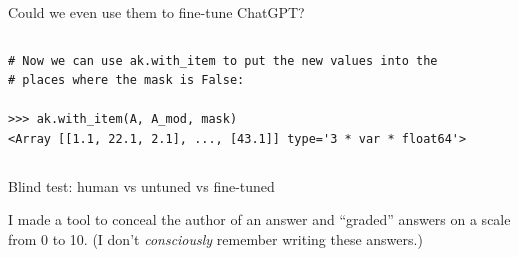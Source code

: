 \documentclass[aspectratio=169]{beamer}
\begin{document}
\begin{frame}[fragile]{Could we even use them to fine-tune ChatGPT?}
\begin{columns}
\begin{uncoverenv}
\begin{verbatim}
# Now we can use ak.with_item to put the new values into the
# places where the mask is False:

>>> ak.with_item(A, A_mod, mask)
<Array [[1.1, 22.1, 2.1], ..., [43.1]] type='3 * var * float64'>
\end{verbatim}
\end{uncoverenv}
\end{columns}
\end{frame}

\begin{frame}{Blind test: human vs untuned vs fine-tuned}
\large
\vspace{0.5 cm}

I made a tool to conceal the author of an answer and ``graded'' answers on a scale from 0 to 10. (I don't {\it consciously} remember writing these answers.)

\vspace{0.35 cm}
\begin{center}
\end{center}

\vspace{0.25 cm}
\end{frame}
\end{document}
